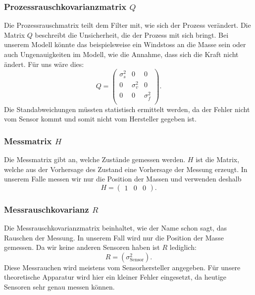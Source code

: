 \subsubsection*{Prozessrauschkovarianzmatrix $Q$}
Die Prozessrauschmatrix teilt dem Filter mit, wie sich der Prozess verändert. 
Die Matrix $Q$ beschreibt die Unsicherheit, die der Prozess mit sich bringt. 
Bei unserem Modell könnte das beispielsweise ein Windstoss an die Masse sein
oder auch Ungenauigkeiten im Modell, wie die Annahme, dass sich die Kraft nicht ändert.
Für uns wäre dies:
\[ 
Q =
 \begin{pmatrix}
\sigma_s^2& 0& 0 \\ 
0 & \sigma_v ^2& 0\\ 
0 & 0& \sigma_f^2\\
\end{pmatrix} .
 \]
Die Standabweichungen müssten statistisch ermittelt werden, da der Fehler nicht vom Sensor kommt und somit nicht vom Hersteller gegeben ist. 

\subsubsection*{Messmatrix $H$}
Die Messmatrix gibt an, welche Zustände gemessen werden. 
$H$ ist die Matrix, welche aus der Vorhersage des Zustand eine Vorhersage der Messung erzeugt.
In unserem Falle messen wir nur die Position der Massen und verwenden deshalb
\[ 
H = \begin{pmatrix} 1 & 0 & 0 \end{pmatrix} .
\]

\subsubsection*{Messrauschkovarianz $R$}
Die Messrauschkovarianzmatrix beinhaltet, wie der Name schon sagt, das Rauschen der Messung. 
In unserem Fall wird nur die Position der Masse gemessen. Da wir keine anderen Sensoren haben ist $R$ lediglich:
\[ 
R= (\sigma_\mathrm{Sensor}^2).
 \] 
Diese Messrauchen wird meistens vom Sensorhersteller angegeben. 
Für unsere theoretische Apparatur wird hier ein kleiner Fehler eingesetzt,
da heutige Sensoren sehr genau messen können.

